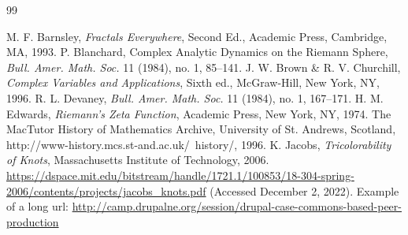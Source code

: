 \newpage

\begin{thebibliography}{99}
\thispagestyle{main}

  M. F. Barnsley, \emph{Fractals Everywhere}, Second Ed., Academic Press, Cambridge, MA, 1993.
  P. Blanchard, Complex Analytic Dynamics on the Riemann Sphere, \emph{Bull. Amer. Math. Soc.} 11 (1984), no. 1, 85--141.
  J. W. Brown \& R. V. Churchill, \emph{Complex Variables and Applications}, Sixth ed., McGraw-Hill,
    New York, NY, 1996.
  R. L. Devaney, \emph{Bull. Amer. Math. Soc.} 11 (1984), no. 1, 167--171.
  H. M. Edwards, \emph{Riemann's Zeta Function}, Academic Press, New York, NY, 1974.
The MacTutor History of Mathematics Archive, University of St.
Andrews, Scotland, http://www-history.mcs.st-and.ac.uk/~history/,
1996.
 K. Jacobs, \textit{Tricolorability of Knots}, Massachusetts Institute of Technology, 2006. \url{https://dspace.mit.edu/bitstream/handle/1721.1/100853/18-304-spring-2006/contents/projects/jacobs\_knots.pdf} (Accessed December 2, 2022).
 Example of a long url: \href{http://camp.drupalne.org/session/drupal-case-commons-based-peer-production}{http://camp.drupalne.org/session/drupal-case-commons-based-peer-production}

\end{thebibliography}
